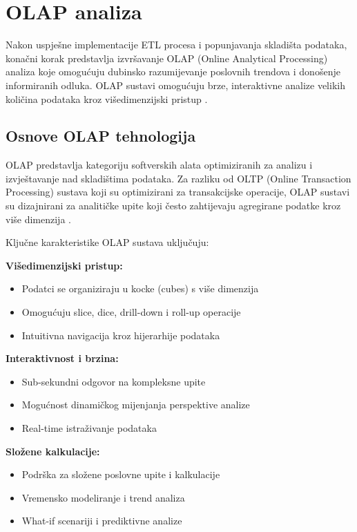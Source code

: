 \section{OLAP analiza}

Nakon uspješne implementacije ETL procesa i popunjavanja skladišta podataka, konačni korak predstavlja izvršavanje OLAP (Online Analytical Processing) analiza koje omogućuju dubinsko razumijevanje poslovnih trendova i donošenje informiranih odluka. OLAP sustavi omogućuju brze, interaktivne analize velikih količina podataka kroz višedimenzijski pristup \cite{Matosic2015}.

\subsection{Osnove OLAP tehnologija}

OLAP predstavlja kategoriju softverskih alata optimiziranih za analizu i izvještavanje nad skladištima podataka. Za razliku od OLTP (Online Transaction Processing) sustava koji su optimizirani za transakcijske operacije, OLAP sustavi su dizajnirani za analitičke upite koji često zahtijevaju agregirane podatke kroz više dimenzija \cite{Chaudhuri1997}.

Ključne karakteristike OLAP sustava uključuju:

\textbf{Višedimenzijski pristup:}
\begin{itemize}
    \item Podatci se organiziraju u kocke (cubes) s više dimenzija
    \item Omogućuju slice, dice, drill-down i roll-up operacije
    \item Intuitivna navigacija kroz hijerarhije podataka
\end{itemize}

\textbf{Interaktivnost i brzina:}
\begin{itemize}
    \item Sub-sekundni odgovor na kompleksne upite
    \item Mogućnost dinamičkog mijenjanja perspektive analize
    \item Real-time istraživanje podataka
\end{itemize}

\textbf{Složene kalkulacije:}
\begin{itemize}
    \item Podrška za složene poslovne upite i kalkulacije
    \item Vremensko modeliranje i trend analiza
    \item What-if scenariji i prediktivne analize
\end{itemize}

